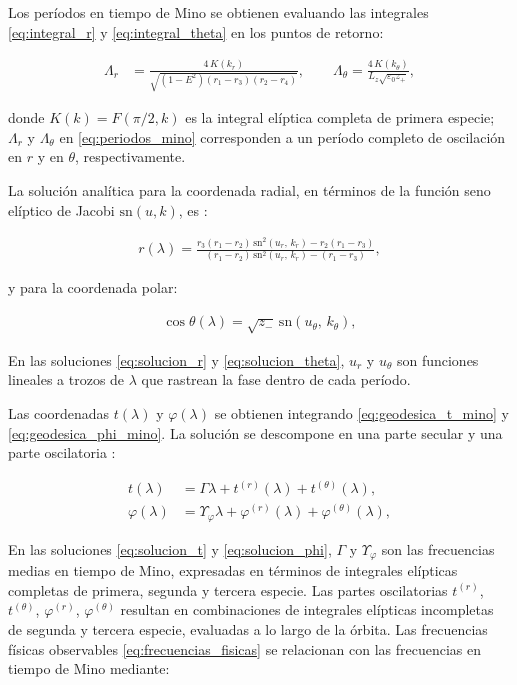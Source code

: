 Los períodos en tiempo de Mino se obtienen evaluando las integrales \eqref{eq:integral_r} y \eqref{eq:integral_theta} en los puntos de retorno:

\begin{align}
    \Lambda_r &= \frac{4\,K(k_r)}{\sqrt{(1-E^2)(r_1-r_3)(r_2-r_4)}}, \qquad
    \Lambda_\theta = \frac{4\,K(k_\theta)}{L_z\sqrt{\varepsilon_0 z_+}}, \label{eq:periodos_mino}
\end{align}

donde $K(k) = F(\pi/2, k)$ es la integral elíptica completa de primera especie; $\Lambda_r$ y $\Lambda_\theta$ en \eqref{eq:periodos_mino} corresponden a un período completo de oscilación en $r$ y en $\theta$, respectivamente.

La solución analítica para la coordenada radial, en términos de la función seno elíptico de Jacobi $\mathrm{sn}(u,k)$, es \cite{fujita2009analytical}:

\begin{align}
    r(\lambda) = \frac{r_3(r_1 - r_2)\,\mathrm{sn}^2(u_r,\,k_r) - r_2(r_1 - r_3)}{(r_1 - r_2)\,\mathrm{sn}^2(u_r,\,k_r) - (r_1 - r_3)}, \label{eq:solucion_r}
\end{align}

y para la coordenada polar:

\begin{align}
    \cos\theta(\lambda) = \sqrt{z_-}\,\mathrm{sn}(u_\theta,\,k_\theta), \label{eq:solucion_theta}
\end{align}

En las soluciones \eqref{eq:solucion_r} y \eqref{eq:solucion_theta}, $u_r$ y $u_\theta$ son funciones lineales a trozos de $\lambda$ que rastrean la fase dentro de cada período.

Las coordenadas $t(\lambda)$ y $\varphi(\lambda)$ se obtienen integrando \eqref{eq:geodesica_t_mino} y \eqref{eq:geodesica_phi_mino}. La solución se descompone en una parte secular y una parte oscilatoria \cite{fujita2009analytical}:

\begin{align}
    t(\lambda) &= \Gamma\lambda + t^{(r)}(\lambda) + t^{(\theta)}(\lambda), \label{eq:solucion_t} \\
    \varphi(\lambda) &= \Upsilon_\varphi\lambda + \varphi^{(r)}(\lambda) + \varphi^{(\theta)}(\lambda), \label{eq:solucion_phi}
\end{align}

En las soluciones \eqref{eq:solucion_t} y \eqref{eq:solucion_phi}, $\Gamma$ y $\Upsilon_\varphi$ son las frecuencias medias en tiempo de Mino, expresadas en términos de integrales elípticas completas de primera, segunda y tercera especie. Las partes oscilatorias $t^{(r)}$, $t^{(\theta)}$, $\varphi^{(r)}$, $\varphi^{(\theta)}$ resultan en combinaciones de integrales elípticas incompletas de segunda y tercera especie, evaluadas a lo largo de la órbita. Las frecuencias físicas observables \eqref{eq:frecuencias_fisicas} se relacionan con las frecuencias en tiempo de Mino mediante:

